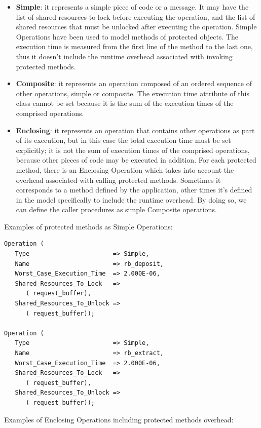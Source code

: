 \documentclass{article}
\begin{document}
\begin{itemize}
   \item \textbf{Simple}: it represents a simple piece of code or a message. It may have the list of shared resources to lock before executing the operation, and the list of shared resources that must be unlocked after executing the operation. Simple Operations have been used to model methods of protected objects. The execution time is measured from the first line of the method to the last one, thus it doesn't include the runtime overhead associated with invoking protected methods.
   \item \textbf{Composite}: it represents an operation composed of an ordered sequence of other operations, simple or composite. The execution time attribute of this class cannot be set because it is the sum of the execution times of the comprised operations.
   \item \textbf{Enclosing}: it represents an operation that contains other operations as part of its execution, but in this case the total execution time must be set explicitly; it is not the sum of execution times of the comprised operations, because other pieces of code may be executed in addition. For each protected method, there is an Enclosing Operation which takes into account the overhead associated with calling protected methods. Sometimes it corresponds to a method defined by the application, other times it's defined in the model specifically to include the runtime overhead. By doing so, we can define the caller procedures as simple Composite operations.
\end{itemize}

Examples of protected methods as Simple Operations:

\begin{lstlisting}
Operation (
   Type                       => Simple,
   Name                       => rb_deposit,
   Worst_Case_Execution_Time  => 2.000E-06,
   Shared_Resources_To_Lock   =>
      ( request_buffer),
   Shared_Resources_To_Unlock =>
      ( request_buffer));

Operation (
   Type                       => Simple,
   Name                       => rb_extract,
   Worst_Case_Execution_Time  => 2.000E-06,
   Shared_Resources_To_Lock   =>
      ( request_buffer),
   Shared_Resources_To_Unlock =>
      ( request_buffer));
\end{lstlisting}

Examples of Enclosing Operations including protected methods overhead:
\end{document}
